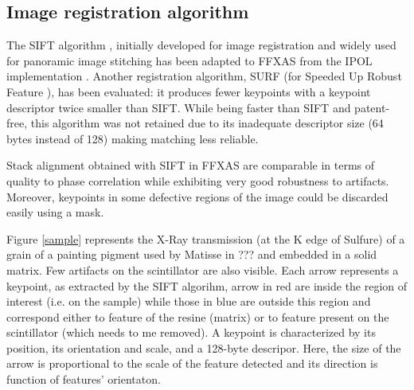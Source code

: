 \documentclass[preprint]{iucr}
\begin{document}
\subsection{Image registration algorithm}

The SIFT algorithm \cite{Lowe99,Lowe04}, initially developed
for image registration and widely used for panoramic image stitching has been
adapted to FFXAS from the IPOL implementation \cite{ASIFT}.
Another registration algorithm, SURF (for Speeded Up Robust Feature
\cite{surf}), has been evaluated: it produces fewer keypoints with a keypoint
descriptor twice smaller than SIFT. 
While being faster than SIFT and patent-free, this algorithm was not
retained due to its inadequate descriptor size (64 bytes instead of 128)
making matching less reliable.

Stack alignment obtained with SIFT in FFXAS are comparable in terms of
quality to phase correlation while exhibiting very good robustness
to artifacts.
Moreover, keypoints in some defective regions of the image could be
discarded easily using a mask.

Figure \ref{sample} represents the X-Ray transmission (at the K edge of Sulfure)
of a grain of a painting pigment used by Matisse in ??? and embedded in a solid
matrix. 
Few artifacts on the scintillator are also visible. 
Each arrow represents a keypoint, as extracted by the SIFT algorihm, arrow in
red are inside the region of interest (i.e. on the sample) 
while those in blue are outside this region and
correspond either to feature of the resine (matrix) or to feature present on the
scintillator (which needs to me removed).
A keypoint is characterized by its position, its orientation and scale, and a
128-byte descripor.
Here, the size of the arrow is proportional to the scale of the feature
detected and its direction is function of features' orientaton.
 
\end{document}
